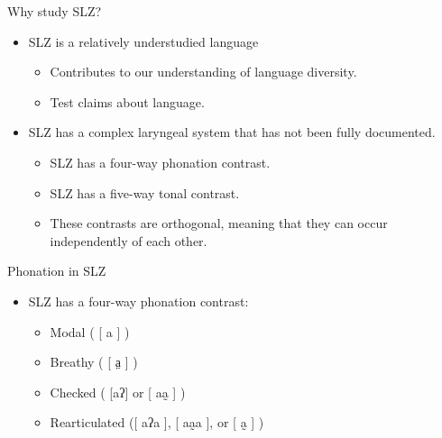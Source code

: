 \documentclass[professionalfonts]{beamer}
\begin{document}
\begin{frame}{Why study SLZ?}
  \begin{itemize}
        \item SLZ is a relatively understudied language
        \begin{itemize}
          \item Contributes to our understanding of language diversity.
          \item Test claims about language.
        \end{itemize}
    \item SLZ has a complex laryngeal system that has not been fully documented.
    \begin{itemize}
      \item SLZ has a four-way phonation contrast.
      \item SLZ has a five-way tonal contrast.
      \item These contrasts are orthogonal, meaning that they can occur independently of each other.
    \end{itemize} 
  \end{itemize}
\end{frame}

\begin{frame}{Phonation in SLZ}
  \begin{itemize}
    \item SLZ has a four-way phonation contrast:
    \begin{itemize}
      \item Modal ( [ a ] )
      \item Breathy ( [ a̤ ] )
      \item Checked ( [aʔ] or [ aa̰ ] )
      \item Rearticulated ([ aʔa ], [ aa̰a ], or [ a̰ ] )
    \end{itemize}
  \end{itemize}
\end{frame}
\end{document}
